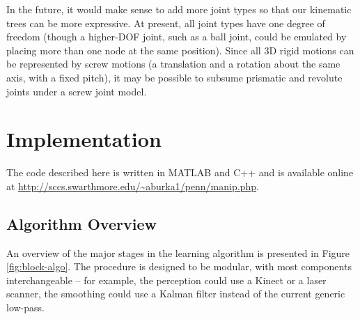 \documentclass[a4paper,orivec]{llncs}
\begin{document}
In the future, it would make sense to add more joint types so that our kinematic trees can be more expressive. At present, all joint types have one degree of freedom (though a higher-DOF joint, such as a ball joint, could be emulated by placing more than one node at the same position). Since all 3D rigid motions can be represented by screw motions (a translation and a rotation about the same axis, with a fixed pitch), it may be possible to subsume prismatic and revolute joints under a screw joint model.

\section{Implementation} \label{sec:implementation}
The code described here is written in MATLAB and C++ and is available online at \url{http://sccs.swarthmore.edu/~aburka1/penn/manip.php}.

\subsection{Algorithm Overview} \label{sec:algorithm}
An overview of the major stages in the learning algorithm is presented in Figure \ref{fig:block-algo}. The procedure is designed to be modular, with most components interchangeable -- for example, the perception could use a Kinect or a laser scanner, the smoothing could use a Kalman filter instead of the current generic low-pass.
\end{document}

